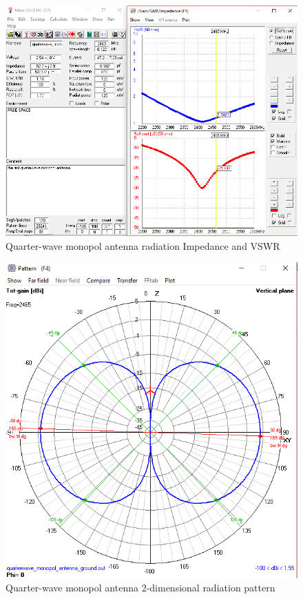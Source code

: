 \begin{figure}[h!]
\centering
\includegraphics[scale=0.60]{figures/QuaterwaveMonopolAntennaImpedanceVSWR.PNG}
\caption{Quarter-wave monopol  antenna radiation Impedance and VSWR}
\end{figure}

\begin{figure}[h!]
\centering
\includegraphics[scale=0.60]{figures/QuaterwaveMonopolAntennaRadiationPattern.PNG}
\caption{Quarter-wave monopol  antenna 2-dimensional radiation pattern}
\end{figure}

